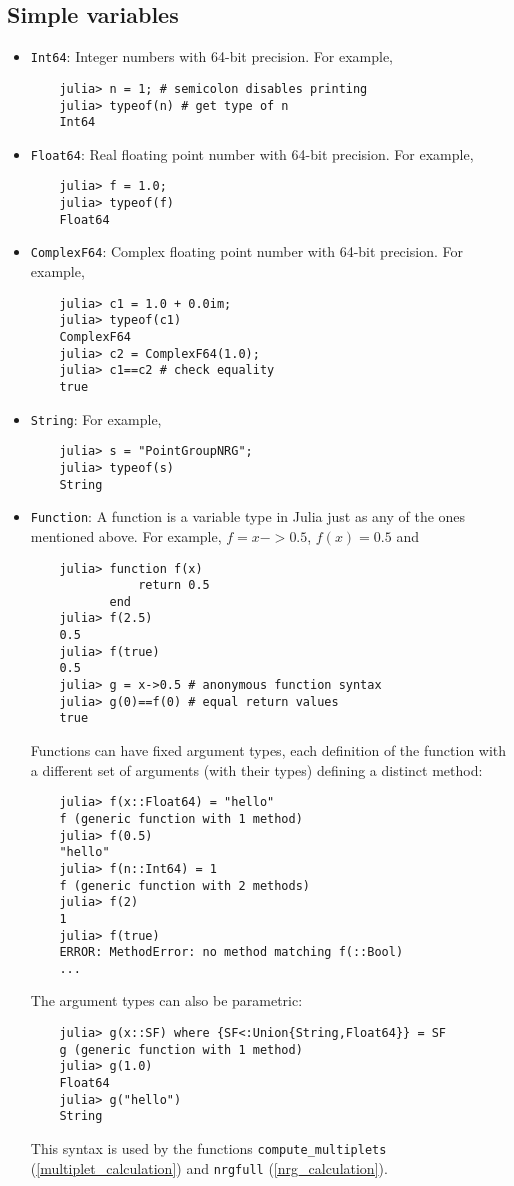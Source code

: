 \documentclass[notitlepage]{article}
\begin{document}
\subsection{Simple variables}
\begin{itemize}
    \item \texttt{Int64}: Integer numbers with 64-bit
        precision. For example, 
\begin{verbatim}
    julia> n = 1; # semicolon disables printing
    julia> typeof(n) # get type of n
    Int64
\end{verbatim}
    \item \texttt{Float64}: Real floating point number with
        64-bit precision. For example, 
\begin{verbatim}
    julia> f = 1.0;
    julia> typeof(f)
    Float64
\end{verbatim}
    \item \texttt{ComplexF64}: Complex floating point number
        with 64-bit precision. For example,
\begin{verbatim}
    julia> c1 = 1.0 + 0.0im;
    julia> typeof(c1)
    ComplexF64
    julia> c2 = ComplexF64(1.0);
    julia> c1==c2 # check equality
    true
\end{verbatim}
    \item \texttt{String}: For example,
\begin{verbatim}
    julia> s = "PointGroupNRG";
    julia> typeof(s)
    String
\end{verbatim}
    \item \texttt{Function}: A function is a variable type
        in Julia just as any of the ones mentioned above.
        For example, $f=x->0.5$, $f(x)=0.5$ and 
\begin{verbatim}
    julia> function f(x)
               return 0.5
           end
    julia> f(2.5)
    0.5
    julia> f(true)
    0.5
    julia> g = x->0.5 # anonymous function syntax
    julia> g(0)==f(0) # equal return values
    true
\end{verbatim}
        Functions can have fixed argument types, each
        definition of the function with a different set of
        arguments (with their types) defining a distinct
        method:
\begin{verbatim}
    julia> f(x::Float64) = "hello"
    f (generic function with 1 method)
    julia> f(0.5)
    "hello"
    julia> f(n::Int64) = 1
    f (generic function with 2 methods)
    julia> f(2)
    1
    julia> f(true)
    ERROR: MethodError: no method matching f(::Bool)
    ...
\end{verbatim}
        The argument types can also be parametric:
\begin{verbatim}
    julia> g(x::SF) where {SF<:Union{String,Float64}} = SF
    g (generic function with 1 method)
    julia> g(1.0)
    Float64
    julia> g("hello")
    String
\end{verbatim}
        This syntax is used by the functions
        \texttt{compute\_multiplets}
        (\ref{multiplet_calculation}) and \texttt{nrgfull}
        (\ref{nrg_calculation}).
\end{itemize}
\end{document}
